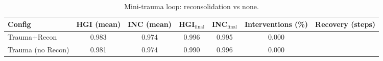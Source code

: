 \begin{table}[H]
\centering
\caption{Mini-trauma loop: reconsolidation vs none.}
\label{tab:mini_trauma}
\begin{tabular}{lcccccc}
\toprule
Config & HGI (mean) & INC (mean) & HGI$_{\text{final}}$ & INC$_{\text{final}}$ & Interventions (\%) & Recovery (steps) \\
\midrule
 Trauma+Recon & 0.983 & 0.974 & 0.996 & 0.995 & 0.000 &  \\
 Trauma (no Recon) & 0.981 & 0.974 & 0.990 & 0.996 & 0.000 &  \\
\bottomrule
\end{tabular}
\end{table}